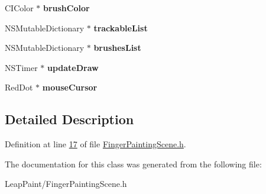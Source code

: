 \begin{DoxyCompactItemize}
\item 
\hypertarget{interface_finger_painting_scene_af83c54f1d8ddb6ed733144294b6e9634}{C\-I\-Color $\ast$ {\bfseries brush\-Color}}\label{dd/df0/interface_finger_painting_scene_af83c54f1d8ddb6ed733144294b6e9634}

\item 
\hypertarget{interface_finger_painting_scene_afd3ae925a75735b1c4ed442a758b57d9}{N\-S\-Mutable\-Dictionary $\ast$ {\bfseries trackable\-List}}\label{dd/df0/interface_finger_painting_scene_afd3ae925a75735b1c4ed442a758b57d9}

\item 
\hypertarget{interface_finger_painting_scene_ae7cd9b432bce54e233c8f991688df1ba}{N\-S\-Mutable\-Dictionary $\ast$ {\bfseries brushes\-List}}\label{dd/df0/interface_finger_painting_scene_ae7cd9b432bce54e233c8f991688df1ba}

\item 
\hypertarget{interface_finger_painting_scene_abfbce356d00c473f2b40cef5b01bce4c}{N\-S\-Timer $\ast$ {\bfseries update\-Draw}}\label{dd/df0/interface_finger_painting_scene_abfbce356d00c473f2b40cef5b01bce4c}

\item 
\hypertarget{interface_finger_painting_scene_a5e0af6290118f343b985444addf6aa40}{Red\-Dot $\ast$ {\bfseries mouse\-Cursor}}\label{dd/df0/interface_finger_painting_scene_a5e0af6290118f343b985444addf6aa40}

\end{DoxyCompactItemize}


\subsection{Detailed Description}


Definition at line \hyperlink{_finger_painting_scene_8h_source_l00017}{17} of file \hyperlink{_finger_painting_scene_8h_source}{Finger\-Painting\-Scene.\-h}.



The documentation for this class was generated from the following file\-:\begin{DoxyCompactItemize}
\item 
Leap\-Paint/Finger\-Painting\-Scene.\-h\end{DoxyCompactItemize}
